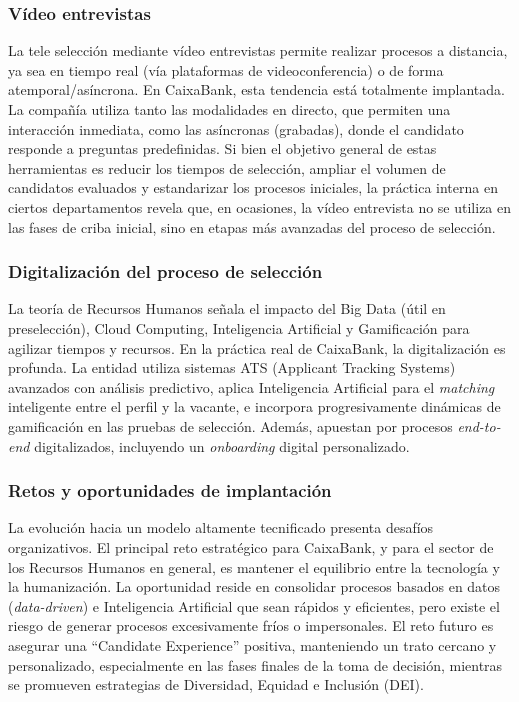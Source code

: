 \subsubsection{Vídeo entrevistas}
La tele selección mediante vídeo entrevistas permite realizar procesos a distancia, ya sea en tiempo real (vía plataformas de videoconferencia) o de forma atemporal/asíncrona. En CaixaBank, esta tendencia está totalmente implantada. La compañía utiliza tanto las modalidades en directo, que permiten una interacción inmediata, como las asíncronas (grabadas), donde el candidato responde a preguntas predefinidas. Si bien el objetivo general de estas herramientas es reducir los tiempos de selección, ampliar el volumen de candidatos evaluados y estandarizar los procesos iniciales, la práctica interna en ciertos departamentos revela que, en ocasiones, la vídeo entrevista no se utiliza en las fases de criba inicial, sino en etapas más avanzadas del proceso de selección.

\subsubsection{Digitalización del proceso de selección}
La teoría de Recursos Humanos señala el impacto del Big Data (útil en preselección), Cloud Computing, Inteligencia Artificial y Gamificación para agilizar tiempos y recursos. En la práctica real de CaixaBank, la digitalización es profunda. La entidad utiliza sistemas ATS (Applicant Tracking Systems) avanzados con análisis predictivo, aplica Inteligencia Artificial para el \textit{matching} inteligente entre el perfil y la vacante, e incorpora progresivamente dinámicas de gamificación en las pruebas de selección. Además, apuestan por procesos \textit{end-to-end} digitalizados, incluyendo un \textit{onboarding} digital personalizado.

\subsubsection{Retos y oportunidades de implantación}
La evolución hacia un modelo altamente tecnificado presenta desafíos organizativos. El principal reto estratégico para CaixaBank, y para el sector de los Recursos Humanos en general, es mantener el equilibrio entre la tecnología y la humanización. La oportunidad reside en consolidar procesos basados en datos (\textit{data-driven}) e Inteligencia Artificial que sean rápidos y eficientes, pero existe el riesgo de generar procesos excesivamente fríos o impersonales. El reto futuro es asegurar una ``Candidate Experience'' positiva, manteniendo un trato cercano y personalizado, especialmente en las fases finales de la toma de decisión, mientras se promueven estrategias de Diversidad, Equidad e Inclusión (DEI).
